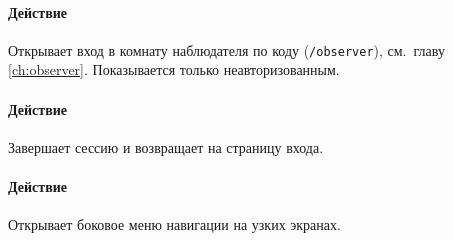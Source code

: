 \paragraph{Действие}
Открывает вход в комнату наблюдателя по коду (\texttt{/observer}), см.\ главу \ref{ch:observer}. Показывается только неавторизованным.

\paragraph{Действие}
Завершает сессию и возвращает на страницу входа.

\paragraph{Действие}
Открывает боковое меню навигации на узких экранах.
